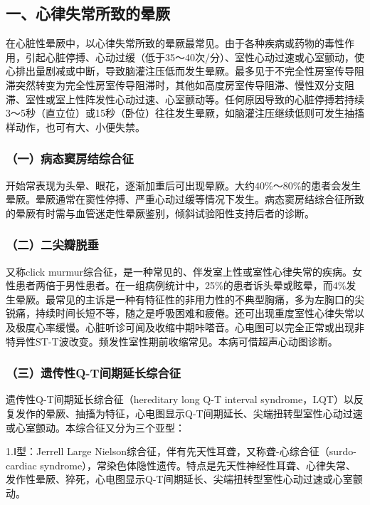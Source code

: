 \subsection{一、心律失常所致的晕厥}

在心脏性晕厥中，以心律失常所致的晕厥最常见。由于各种疾病或药物的毒性作用，引起心脏停搏、心动过缓（低于35～40次/分）、室性心动过速或心室颤动，使心排出量剧减或中断，导致脑灌注压低而发生晕厥。最多见于不完全性房室传导阻滞突然转变为完全性房室传导阻滞时，其他如高度房室传导阻滞、慢性双分支阻滞、室性或室上性阵发性心动过速、心室颤动等。任何原因导致的心脏停搏若持续3～5秒（直立位）或15秒（卧位）往往发生晕厥，如脑灌注压继续低则可发生抽搐样动作，也可有大、小便失禁。

\subsubsection{（一）病态窦房结综合征}

开始常表现为头晕、眼花，逐渐加重后可出现晕厥。大约40\%～80\%的患者会发生晕厥。晕厥通常在窦性停搏、严重心动过缓等情况下发生。病态窦房结综合征所致的晕厥有时需与血管迷走性晕厥鉴别，倾斜试验阳性支持后者的诊断。

\subsubsection{（二）二尖瓣脱垂}

又称click
murmur综合征，是一种常见的、伴发室上性或室性心律失常的疾病。女性患者两倍于男性患者。在一组病例统计中，25\%的患者诉头晕或眩晕，而4\%发生晕厥。最常见的主诉是一种有特征性的非用力性的不典型胸痛，多为左胸口的尖锐痛，持续时间长短不等，随之是呼吸困难和疲倦。还可出现重度室性心律失常以及极度心率缓慢。心脏听诊可闻及收缩中期咔嗒音。心电图可以完全正常或出现非特异性ST-T波改变。频发性室性期前收缩常见。本病可借超声心动图诊断。

\subsubsection{（三）遗传性Q-T间期延长综合征}

遗传性Q-T间期延长综合征（hereditary long Q-T interval
syndrome，LQT）以反复发作的晕厥、抽搐为特征，心电图显示Q-T间期延长、尖端扭转型室性心动过速或心室颤动。本综合征又分为三个亚型：

1.Ⅰ型：Jerrell Large
Nielson综合征，伴有先天性耳聋，又称聋-心综合征（surdo-cardiac
syndrome），常染色体隐性遗传。特点是先天性神经性耳聋、心律失常、发作性晕厥、猝死，心电图显示Q-T间期延长、尖端扭转型室性心动过速或心室颤动。

